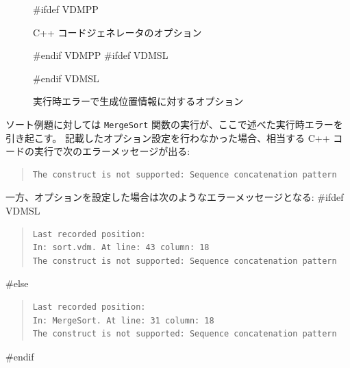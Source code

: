 \documentclass[\pformat,12pt]{jarticle}
\begin{document}
\begin{figure}[tbh]
\begin{center}
\mbox{}
#ifdef VDMPP
\caption{C++ コードジェネレータのオプション}\label{fig:option}
#endif VDMPP
#ifdef VDMSL
\caption{実行時エラーで生成位置情報に対するオプション}\label{fig:option}
#endif VDMSL
\end{center}
\end{figure}
  
ソート例題に対しては \texttt{MergeSort} 関数の実行が、ここで述べた実行時エラーを引き起こす。
記載したオプション設定を行わなかった場合、相当する C++ コードの実行で次のエラーメッセージが出る:
\begin{quote}
\begin{verbatim}
The construct is not supported: Sequence concatenation pattern
\end{verbatim}
\end{quote}
一方、オプションを設定した場合は次のようなエラーメッセージとなる:
#ifdef VDMSL
\begin{quote}
\begin{verbatim}
Last recorded position:
In: sort.vdm. At line: 43 column: 18
The construct is not supported: Sequence concatenation pattern
\end{verbatim}
\end{quote}
#else
\begin{quote}
\begin{verbatim}
Last recorded position:
In: MergeSort. At line: 31 column: 18
The construct is not supported: Sequence concatenation pattern
\end{verbatim}
\end{quote}
#endif
\end{document}
